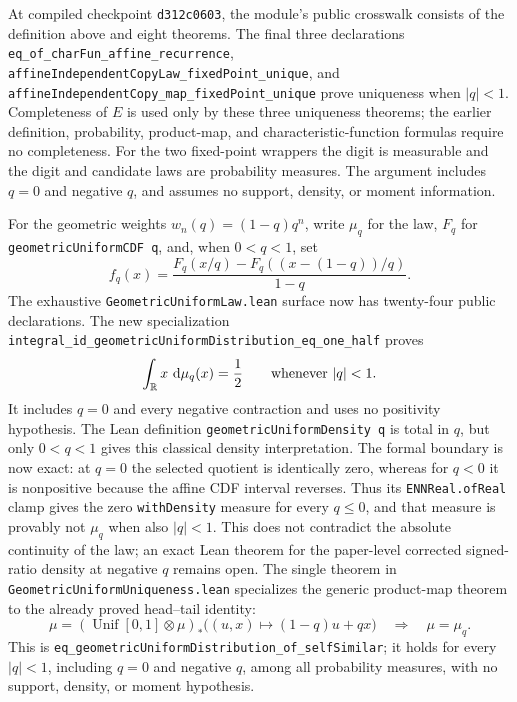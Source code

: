 \documentclass[11pt,oneside]{article}
\theoremstyle{definition}
\theoremstyle{remark}
\begin{document}
At compiled checkpoint \nolinkurl{d312c0603}, the module's public crosswalk
consists of the definition above and eight theorems.  The final three declarations
\nolinkurl{eq_of_charFun_affine_recurrence},
\nolinkurl{affineIndependentCopyLaw_fixedPoint_unique}, and
\nolinkurl{affineIndependentCopy_map_fixedPoint_unique} prove uniqueness when
\(\lvert q\rvert<1\).  Completeness of \(E\) is used only by these three
uniqueness theorems; the earlier definition, probability, product-map, and
characteristic-function formulas require no completeness.  For the two
fixed-point wrappers the digit is measurable and the digit and candidate laws
are probability measures.  The argument includes \(q=0\) and negative \(q\),
and assumes no support, density, or moment information.

For the geometric weights \(w_n(q)=(1-q)q^n\), write \(\mu_q\) for the law,
\(F_q\) for \nolinkurl{geometricUniformCDF q}, and, when \(0<q<1\), set
\[
  f_q(x)=
  \frac{F_q(x/q)-F_q((x-(1-q))/q)}{1-q}.
\]
The exhaustive \nolinkurl{GeometricUniformLaw.lean} surface now has twenty-four public
declarations.  The new specialization
\nolinkurl{integral_id_geometricUniformDistribution_eq_one_half} proves
\[
 \int_{\mathbb{R}}x\,\mathop{}\!\mathrm{d}\mu_q(x)=\frac12
 \qquad\text{whenever }\lvert q\rvert<1.
\]
It includes \(q=0\) and every negative contraction and uses no positivity hypothesis.
The Lean definition \nolinkurl{geometricUniformDensity q} is total in \(q\),
but only \(0<q<1\) gives this classical density interpretation.  The formal
boundary is now exact: at \(q=0\) the selected quotient is identically zero,
whereas for \(q<0\) it is nonpositive because the affine CDF interval reverses.
Thus its \nolinkurl{ENNReal.ofReal} clamp gives the zero
\nolinkurl{withDensity} measure for every \(q\le0\), and that measure is
provably not \(\mu_q\) when also \(\lvert q\rvert<1\).  This does not contradict
the absolute continuity of the law; an exact Lean theorem for the paper-level
corrected signed-ratio density at negative \(q\) remains open.
The single theorem in \nolinkurl{GeometricUniformUniqueness.lean} specializes
the generic product-map theorem to the already proved head--tail identity:
\[
 \mu=(\operatorname{Unif}[0,1]\otimes\mu)_*
       \bigl((u,x)\mapsto(1-q)u+qx\bigr)
 \quad\Longrightarrow\quad \mu=\mu_q.
\]
This is
\nolinkurl{eq_geometricUniformDistribution_of_selfSimilar}; it holds for every
\(\lvert q\rvert<1\), including \(q=0\) and negative \(q\), among all
probability measures, with no support, density, or moment hypothesis.
\end{document}
